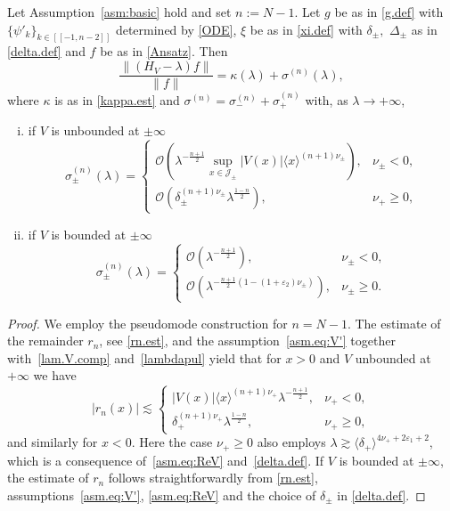 \begin{Theorem}\label{thm:basic}
Let Assumption~\ref{asm:basic} hold and set $n:=N-1$.
Let $g$ be as in \eqref{g.def} with $\{\psi'_k\}_{k\in[[-1,n-2]]}$ determined by \eqref{ODE}, $\xi$ be as in \eqref{xi.def} with $\delta_\pm,$ $\Delta_\pm$ as in \eqref{delta.def} and $f$ be as in \eqref{Ansatz}. 
Then
\begin{equation}\label{HV.f.dec}
\frac{\|(H_V-\lambda) f\|}{\|f\|} = \kappa(\lambda) + \sigma^{(n)}(\lambda), 
\end{equation}
where $\kappa$ is as in \eqref{kappa.est} 
and $\sigma^{(n)} = \sigma_-^{(n)}  + \sigma_+^{(n)}$ with, as $\lambda \to + \infty$,
\begin{enumerate}[i)]
	\item if $V$ is unbounded at $\pm \infty$
\begin{equation}
\sigma_\pm^{(n)}(\lambda) =
\begin{cases}
{\mathcal{O}}(\lambda^{-\frac{n+1}2} \sup_{x \in {\mathcal J}_\pm}{|V(x)|\langle x \rangle^{(n+1)\nu_\pm}}  ), & \nu_\pm < 0,
\\[1mm]
{\mathcal{O}} \left(\delta_\pm^{(n+1) \nu_\pm} \lambda^\frac{1-n}{2} \right),
& \nu_+ \geq 0,
\end{cases}
\end{equation}
\item if $V$ is bounded at $\pm \infty$
\begin{equation}\label{HV.f.dec.bdd}
\sigma_\pm^{(n)}(\lambda)=
\begin{cases}
	{\mathcal{O}} \left( \lambda^{-\frac{n+1}{2}} \right), & \nu_\pm <0,
	\\[2mm]
	{\mathcal{O}} \left( \lambda^{-\frac{n+1}{2}\left(1-(1+{\varepsilon}_2)\nu_\pm\right)} \right), & \nu_\pm \geq 0.
\end{cases}
\end{equation}

\end{enumerate}

\end{Theorem}
\begin{proof}
We employ the pseudomode construction for $n=N-1$. 
The estimate of the remainder $r_n$, see \eqref{rn.est}, 
and the assumption~\eqref{asm.eq:V'} 
together with~\eqref{lam.V.comp} and~\eqref{lambdapul}
yield that for $x>0$ and $V$ unbounded at $+\infty$ 
we have
\begin{equation}
|r_n(x )|
{\lesssim}
\begin{cases}
|V(x)|\langle x \rangle^{(n+1)\nu_+}\lambda^{-\frac{n+1}2}, & \nu_+ < 0, \\[1mm]
\delta_+^{(n+1) \nu_+} \lambda^\frac{1-n}{2} , & \nu_+ \geq 0,
\end{cases}
\end{equation}
and similarly for $x<0$. 
Here the case $\nu_+ \geq 0$ also employs
$\lambda {\gtrsim} \langle \delta_+ \rangle^{4\nu_++2{\varepsilon}_1+2}$,
which is a consequence of~\eqref{asm.eq:ReV} and~\eqref{delta.def}.
If $V$ is bounded at $\pm \infty$, the estimate of $r_n$ follows straightforwardly from \eqref{rn.est}, assumptions~\eqref{asm.eq:V'}, \eqref{asm.eq:ReV} 
and the choice of $\delta_\pm$ in \eqref{delta.def}.
\end{proof}


